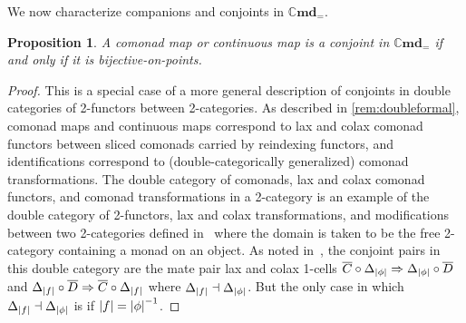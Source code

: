 \documentclass[11pt, oneside, article]{memoir}
\theoremstyle{plain}
\newtheorem{proposition}[theorem]{Proposition}
\theoremstyle{definition}
\theoremstyle{remark}
\DeclarePairedDelimiter{\abs}{\lvert}{\rvert}
\newcommand{\namedcat}[1]{\mathbf{#1}}
\newcommand{\Cmd}{\mathbb{C}\namedcat{md}}
\newcommand{\CmdId}{\Cmd_=}
\newcommand{\CmdIdSet}{\CmdId}
\newcommand{\clift}[1]{\overline{#1}}
\newcommand{\pts}[1]{{\abs{#1}}}
\newcommand{\one}[1]{\pts{#1}}
\newcommand{\reindex}[1]{\Delta_{#1}}
\newcommand{\cmnd}[1]{{#1}}
\newcommand{\cC}{\cmnd{C}}
\newcommand{\cD}{\cmnd{D}}
\begin{document}

We now characterize companions and conjoints in $\CmdIdSet$.

\begin{proposition}
  A comonad map or continuous map is a conjoint in $\CmdIdSet$ if and
  only if it is bijective-on-points.
\end{proposition}
\begin{proof}
  This is a special case of a more general description of conjoints in
  double categories of 2-functors between 2-categories. As described
  in \cref{rem:doubleformal}, comonad maps and continuous maps
  correspond to lax and colax comonad functors between sliced comonads
  carried by reindexing functors, and identifications correspond to
  (double-categorically generalized) comonad transformations. The
  double category of comonads, lax and colax comonad functors, and
  comonad transformations in a 2-category is an example of the double
  category of 2-functors, lax and colax transformations, and
  modifications between two 2-categories defined in~\cite[Proposition
  A.8]{fairbanks-shulman} where the domain is taken to be the free
  2-category containing a monad on an object. As noted in~\cite[Remark
  A.9]{fairbanks-shulman}, the conjoint pairs in this double category
  are the mate pair lax and colax 1-cells
  $\clift{\cC} \circ \reindex{\one{\phi}} \Rightarrow
  \reindex{\one{\phi}} \circ \clift{\cD}$ and
  $\reindex{\one{f}} \circ \clift{\cD} \Rightarrow \clift{\cC} \circ
  \reindex{\one{f}}$ where
  $\reindex{\one{f}} \dashv \reindex{\one{\phi}}$. But the only case
  in which $\reindex{\one{f}} \dashv \reindex{\one{\phi}}$ is if
  $\one{f} = \one{\phi}^{-1}$.
\end{proof}
\end{document}
